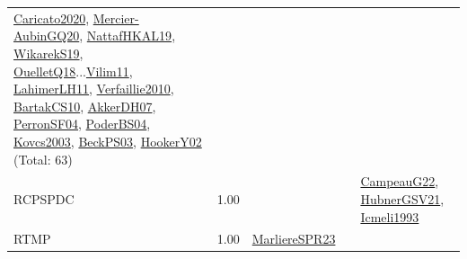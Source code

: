 {\begin{longtable}{p{3cm}r>{\raggedright\arraybackslash}p{6cm}>{\raggedright\arraybackslash}p{6cm}>{\raggedright\arraybackslash}p{8cm}}
\hyperref[detail:Caricato2020]{Caricato2020}, \hyperref[detail:Mercier-AubinGQ20]{Mercier-AubinGQ20}, \hyperref[detail:NattafHKAL19]{NattafHKAL19}, \hyperref[detail:WikarekS19]{WikarekS19}, \hyperref[detail:OuelletQ18]{OuelletQ18}...\hyperref[detail:Vilim11]{Vilim11}, \hyperref[detail:LahimerLH11]{LahimerLH11}, \hyperref[detail:Verfaillie2010]{Verfaillie2010}, \hyperref[detail:BartakCS10]{BartakCS10}, \hyperref[detail:AkkerDH07]{AkkerDH07}, \hyperref[detail:PerronSF04]{PerronSF04}, \hyperref[detail:PoderBS04]{PoderBS04}, \hyperref[detail:Kovcs2003]{Kovcs2003}, \hyperref[detail:BeckPS03]{BeckPS03}, \hyperref[detail:HookerY02]{HookerY02} (Total: 63)\\
\index{RCPSPDC}\index{Classification!RCPSPDC}RCPSPDC &  1.00 &  &  & \hyperref[detail:CampeauG22]{CampeauG22}, \hyperref[detail:HubnerGSV21]{HubnerGSV21}, \hyperref[detail:Icmeli1993]{Icmeli1993}\\
\index{RTMP}\index{Classification!RTMP}RTMP &  1.00 & \hyperref[detail:MarliereSPR23]{MarliereSPR23} &  & \\

\end{longtable}}
